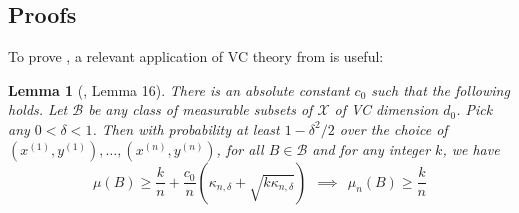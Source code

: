 \documentclass{article}
\def\X{{\mathcal X}}
\def\B{{\mathcal B}}
\newtheorem{lemma}[theorem]{Lemma}
\begin{document}
\subsection{Proofs}

To prove , a relevant application of VC theory from \cite{ChaudhuriDasgupta2010} is useful:
\begin{lemma}[\cite{ChaudhuriDasgupta2010}, Lemma 16]
\label{lemma:points-in-balls-2}
There is an absolute constant $c_0$ such that the following holds. Let $\B$ be any class of measurable subsets of $\X$ of VC dimension $d_0$. Pick any $0 < \delta < 1$. Then with probability at least $1-\delta^2/2$ over the choice of $(x^{(1)}, y^{(1)}), \ldots, (x^{(n)}, y^{(n)})$, for all $B \in \B$ and for any integer $k$, we have
$$ \mu(B) \geq \frac{k}{n} + \frac{c_0}{n} \left( \kappa_{n, \delta} + \sqrt{k \kappa_{n, \delta}} \right)
\ \ \implies \ \ 
\mu_n(B) \geq \frac{k}{n} $$
\end{lemma}
\end{document}
